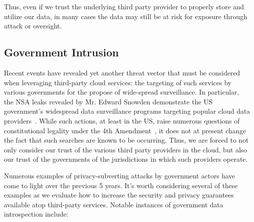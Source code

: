 Thus, even if we trust the underlying third party provider to properly
store and utilize our data, in many cases the data may still be at
risk for exposure through attack or oversight.

\subsection{Government Intrusion}

Recent events have revealed yet another threat vector that must be
considered when leveraging third-party cloud services: the targeting
of such services by various governments for the propose of wide-spread
surveillance. In particular, the NSA leaks revealed by Mr. Edward
Snowden demonstrate the US government's widespread data surveillance
programs targeting popular cloud data
providers~\cite{greenwald-prism}. While such actions, at least in the
US, raise numerous questions of constitutional legality under the 4th
Amendment~\cite{us-constitution-amend4}, it does not at present change
the fact that such searches are known to be occurring. Thus, we are
forced to not only consider our trust of the various third party
providers in the cloud, but also our trust of the governments of the
jurisdictions in which such providers operate.

Numerous examples of privacy-subverting attacks by government actors
have come to light over the previous 5 years. It's worth considering
several of these examples as we evaluate how to increase the security
and privacy guarantees available atop third-party services. Notable
instances of government data introspection include:

